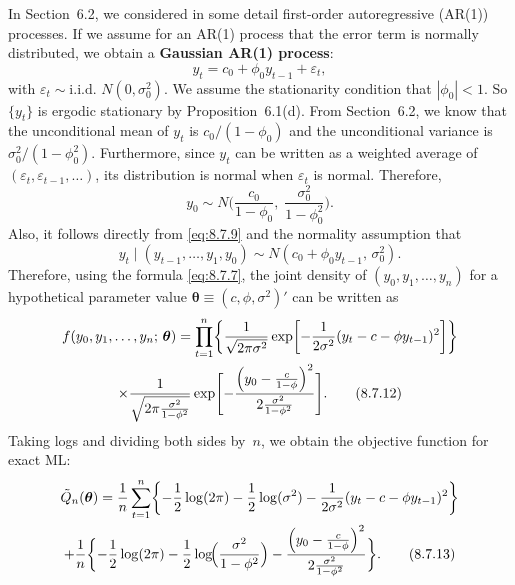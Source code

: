 In Section~6.2, we considered in some detail first-order autoregressive (AR(1))
processes. If we assume for an AR(1) process that the error term is normally
distributed, we obtain a \textbf{Gaussian AR(1) process}:
\begin{equation}
  y_t = c_0 + \phi_0 y_{t-1} + \varepsilon_t,
  \label{eq:8.7.9} \tag{8.7.9}
\end{equation}
with $\varepsilon_t \sim \text{i.i.d.\ } N(0, \sigma_0^2)$. We assume the stationarity condition that $|\phi_0| < 1$.
So $\{y_t\}$ is ergodic stationary by Proposition~6.1(d). From Section~6.2, we know
that the unconditional mean of $y_t$ is $c_0/(1 - \phi_0)$ and the unconditional variance
is $\sigma_0^2/(1 - \phi_0^2)$. Furthermore, since $y_t$ can be written as a weighted average of
$(\varepsilon_t, \varepsilon_{t-1}, \ldots)$, its distribution is normal when $\varepsilon_t$ is normal. Therefore,
\begin{equation}
  y_0 \sim N\!\biggl(\frac{c_0}{1 - \phi_0},\;
    \frac{\sigma_0^2}{1 - \phi_0^2}\biggr).
  \label{eq:8.7.10} \tag{8.7.10}
\end{equation}
Also, it follows directly from \eqref{eq:8.7.9} and the normality assumption that
\begin{equation}
  y_t \mid (y_{t-1}, \ldots, y_1, y_0)
  \sim N(c_0 + \phi_0 y_{t-1},\, \sigma_0^2).
  \label{eq:8.7.11} \tag{8.7.11}
\end{equation}
Therefore, using the formula \eqref{eq:8.7.7}, the joint density of $(y_0, y_1, \ldots, y_n)$ for a
hypothetical parameter value $\boldsymbol{\theta} \equiv (c, \phi, \sigma^2)'$ can be written as
\begin{multline}
  f(y_0, y_1, \ldots, y_n;\, \boldsymbol{\theta})
  = \prod_{t=1}^{n}\biggl\{
    \frac{1}{\sqrt{2\pi\sigma^2}}
    \exp\biggl[-\frac{1}{2\sigma^2}(y_t - c - \phi y_{t-1})^2\biggr]\biggr\} \\
  \times \frac{1}{\sqrt{2\pi\frac{\sigma^2}{1-\phi^2}}}
    \exp\Biggl[-\frac{\Bigl(y_0 - \frac{c}{1-\phi}\Bigr)^2}
    {2\frac{\sigma^2}{1-\phi^2}}\Biggr].
  \label{eq:8.7.12} \tag{8.7.12}
\end{multline}
Taking logs and dividing both sides by~$n$, we obtain the objective function for exact
ML:
\begin{multline}
  \tilde{Q}_n(\boldsymbol{\theta})
  = \frac{1}{n}\sum_{t=1}^{n}
    \biggl\{-\frac{1}{2}\log(2\pi) - \frac{1}{2}\log(\sigma^2)
    - \frac{1}{2\sigma^2}(y_t - c - \phi y_{t-1})^2\biggr\} \\
  + \frac{1}{n}\biggl\{-\frac{1}{2}\log(2\pi)
    - \frac{1}{2}\log\!\Bigl(\frac{\sigma^2}{1-\phi^2}\Bigr)
    - \frac{\Bigl(y_0 - \frac{c}{1-\phi}\Bigr)^2}
      {2\frac{\sigma^2}{1-\phi^2}}\biggr\}.
  \label{eq:8.7.13} \tag{8.7.13}
\end{multline}
